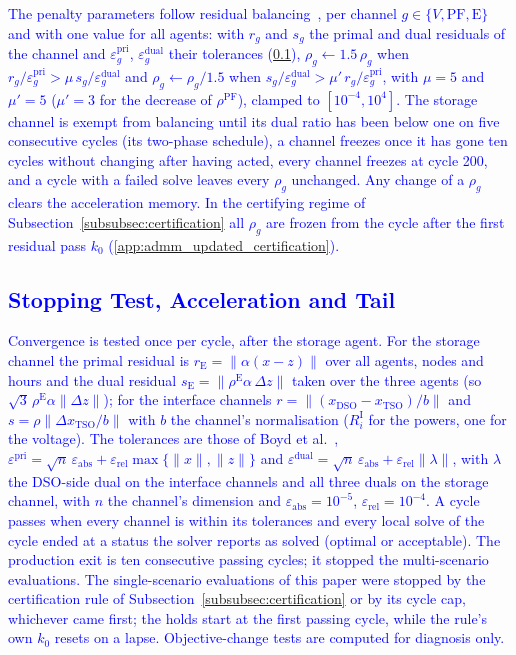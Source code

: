 \documentclass[preprint,12pt]{elsarticle}
\begin{document}
\textcolor{blue}{
    The penalty parameters follow residual balancing~\cite{boyd_admm_2011}, per channel $g \in \{V, \text{PF}, \text{E}\}$ and with one value for all agents: with $r_g$ and $s_g$ the primal and dual residuals of the channel and $\varepsilon^{\text{pri}}_g$, $\varepsilon^{\text{dual}}_g$ their tolerances (\ref{app:admm_updated_stopping}), $\rho_g \gets 1.5\,\rho_g$ when $r_g/\varepsilon^{\text{pri}}_g > \mu\, s_g/\varepsilon^{\text{dual}}_g$ and $\rho_g \gets \rho_g/1.5$ when $s_g/\varepsilon^{\text{dual}}_g > \mu'\, r_g/\varepsilon^{\text{pri}}_g$, with $\mu = 5$ and $\mu' = 5$ ($\mu' = 3$ for the decrease of $\rho^{\text{PF}}$), clamped to $[10^{-4}, 10^{4}]$. The storage channel is exempt from balancing until its dual ratio has been below one on five consecutive cycles (its two-phase schedule), a channel freezes once it has gone ten cycles without changing after having acted, every channel freezes at cycle 200, and a cycle with a failed solve leaves every $\rho_g$ unchanged. Any change of a $\rho_g$ clears the acceleration memory. In the certifying regime of Subsection~\ref{subsubsec:certification} all $\rho_g$ are frozen from the cycle after the first residual pass $k_0$ (\ref{app:admm_updated_certification}).
}

\subsection{\textcolor{blue}{Stopping Test, Acceleration and Tail}}
\label{app:admm_updated_stopping}

\textcolor{blue}{
    Convergence is tested once per cycle, after the storage agent. For the storage channel the primal residual is $r_{\text{E}} = \lVert \alpha (x - z) \rVert$ over all agents, nodes and hours and the dual residual $s_{\text{E}} = \lVert \rho^{\text{E}} \alpha\, \Delta z \rVert$ taken over the three agents (so $\sqrt{3}\,\rho^{\text{E}} \alpha \lVert \Delta z \rVert$); for the interface channels $r = \lVert (x_{\text{DSO}} - x_{\text{TSO}}) / b \rVert$ and $s = \rho \lVert \Delta x_{\text{TSO}} / b \rVert$ with $b$ the channel's normalisation ($R^{\text{I}}_i$ for the powers, one for the voltage). The tolerances are those of Boyd et al.~\cite{boyd_admm_2011}, $\varepsilon^{\text{pri}} = \sqrt{n}\,\varepsilon_{\text{abs}} + \varepsilon_{\text{rel}} \max\{\lVert x \rVert, \lVert z \rVert\}$ and $\varepsilon^{\text{dual}} = \sqrt{n}\,\varepsilon_{\text{abs}} + \varepsilon_{\text{rel}} \lVert \lambda \rVert$, with $\lambda$ the DSO-side dual on the interface channels and all three duals on the storage channel, with $n$ the channel's dimension and $\varepsilon_{\text{abs}} = 10^{-5}$, $\varepsilon_{\text{rel}} = 10^{-4}$. A cycle passes when every channel is within its tolerances and every local solve of the cycle ended at a status the solver reports as solved (optimal or acceptable). 
    The production exit is ten consecutive passing cycles; it stopped the multi-scenario evaluations. The single-scenario evaluations of this paper were stopped by the certification rule of Subsection~\ref{subsubsec:certification} or by its cycle cap, whichever came first; the holds start at the first passing cycle, while the rule's own $k_0$ resets on a lapse. Objective-change tests are computed for diagnosis only.
}
\end{document}

